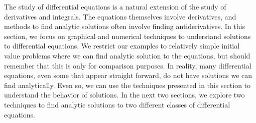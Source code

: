 
The study of differential equations is a natural extension of the study of derivatives and integrals.  The equations themselves involve derivatives, and methods to find analytic solutions often involve finding antiderivatives.   In this section, we focus on graphical and numerical techniques to understand solutions to differential equations.  We restrict our examples to relatively simple initial value problems where we can find analytic solution to the equations, but should remember that this is only for comparison purposes.  In reality, many differential equations, even some that appear straight forward, do not have solutions we can find analytically.  Even so, we can use the techniques presented in this section to understand the behavior of solutions.  In the next two sections, we explore two techniques to find analytic solutions to two different classes of differential equations.